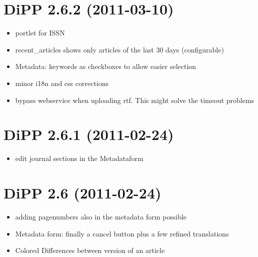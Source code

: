 \documentclass[a4paper,10pt,ngerman]{sphinxmanual}
\begin{document}
\section{DiPP 2.6.2 (2011-03-10)}
\label{changelog:dipp-2-6-2-2011-03-10}\begin{itemize}
\item {} 
portlet for ISSN

\item {} 
recent\_articles shows only articles of the last 30 days (configurable)

\item {} 
Metadata: keywords as checkboxes to allow easier selection

\item {} 
minor i18n and css corrections

\item {} 
bypass webservice when uploading rtf. This might solve the timeout
problems

\end{itemize}


\section{DiPP 2.6.1 (2011-02-24)}
\label{changelog:dipp-2-6-1-2011-02-24}\begin{itemize}
\item {} 
edit journal sections in the Metadataform

\end{itemize}


\section{DiPP 2.6 (2011-02-24)}
\label{changelog:dipp-2-6-2011-02-24}\begin{itemize}
\item {} 
adding pagenumbers also in the metadata form possible

\item {} 
Metadata form: finally a cancel button plus a few refined translations

\item {} 
Colored Differences between version of an article

\end{itemize}
\end{document}

